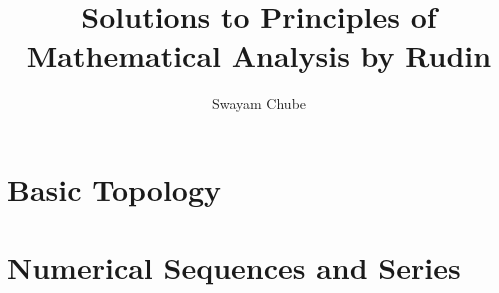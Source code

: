 \documentclass{article}
\title{Solutions to Principles of Mathematical Analysis by Rudin}
\author{Swayam Chube}
\begin{document}
\maketitle
\setcounter{section}{1}


\section{Basic Topology}


\section{Numerical Sequences and Series}

\end{document}
